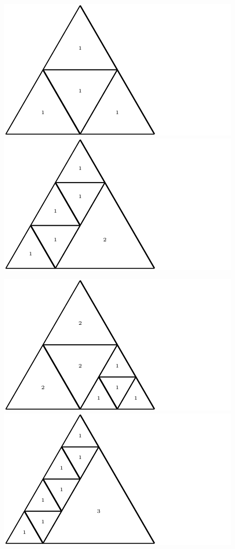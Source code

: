 \documentclass[12pt,amstags,fleqn]{article}
\theoremstyle{plain}
\theoremstyle{definition}
\begin{document}
\begin{center}
\includegraphics{max_relative_size_4.pdf}\includegraphics{max_relative_size_6.pdf}
\end{center}
\begin{center}
\includegraphics{max_relative_size_7.pdf}\includegraphics{max_relative_size_8.pdf}
\end{center}
\end{document}
